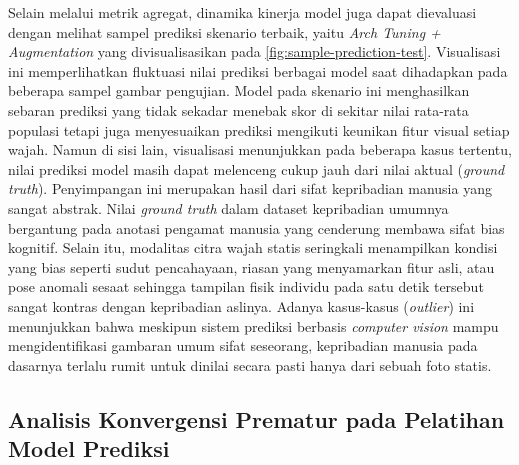 Selain melalui metrik agregat, dinamika kinerja model juga dapat dievaluasi dengan melihat sampel prediksi skenario terbaik, yaitu \textit{Arch Tuning + Augmentation} yang divisualisasikan pada \autoref{fig:sample-prediction-test}. Visualisasi ini memperlihatkan fluktuasi nilai prediksi berbagai model saat dihadapkan pada beberapa sampel gambar pengujian. Model pada skenario ini menghasilkan sebaran prediksi yang tidak sekadar menebak skor di sekitar nilai rata-rata populasi tetapi juga menyesuaikan prediksi mengikuti keunikan fitur visual setiap wajah. Namun di sisi lain, visualisasi menunjukkan pada beberapa kasus tertentu, nilai prediksi model masih dapat melenceng cukup jauh dari nilai aktual (\textit{ground truth}). Penyimpangan ini merupakan hasil dari sifat kepribadian manusia yang sangat abstrak. Nilai \textit{ground truth} dalam dataset kepribadian umumnya bergantung pada anotasi pengamat manusia yang cenderung membawa sifat bias kognitif. Selain itu, modalitas citra wajah statis seringkali menampilkan kondisi yang bias seperti sudut pencahayaan, riasan yang menyamarkan fitur asli, atau pose anomali sesaat sehingga tampilan fisik individu pada satu detik tersebut sangat kontras dengan kepribadian aslinya. Adanya kasus-kasus (\textit{outlier}) ini menunjukkan bahwa meskipun sistem prediksi berbasis \textit{computer vision} mampu mengidentifikasi gambaran umum sifat seseorang, kepribadian manusia pada dasarnya terlalu rumit untuk dinilai secara pasti hanya dari sebuah foto statis.

\subsection{Analisis Konvergensi Prematur pada Pelatihan Model Prediksi}
\label{subsec:analisis-konvergensi-model-prediksi}

